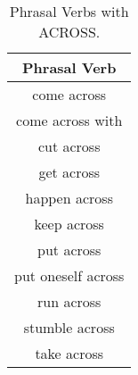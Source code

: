 
\begin{longtable}{c}
\caption{Phrasal Verbs with ACROSS.}
\label{a:across} \\
\midrule
\toprule 
\textbf{Phrasal Verb} \\
\midrule
come across \\
come across with \\
cut across \\
get across \\
happen across \\
keep across \\
put across \\
put oneself across \\
run across \\
stumble across \\
take across \\
\bottomrule
\midrule
\end{longtable}


